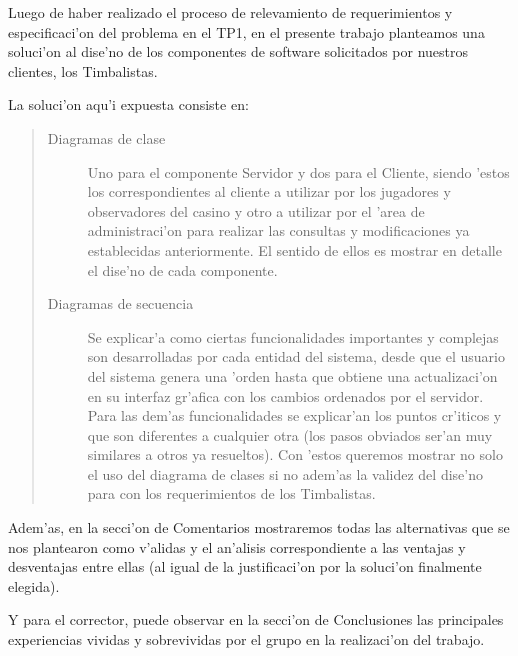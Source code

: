 Luego de haber realizado el proceso de relevamiento de requerimientos y especificaci'on del problema en el TP1, en el presente trabajo planteamos una soluci'on al dise'no de los componentes de software solicitados por nuestros clientes, los Timbalistas. 

\noindent La soluci'on aqu'i expuesta consiste en:
\begin{quote}
\begin{description}
\item[Diagramas de clase] Uno para el componente Servidor y dos para el Cliente, siendo 'estos los correspondientes al cliente a utilizar por los jugadores y observadores del casino y otro a utilizar por el 'area de administraci'on para realizar las consultas y modificaciones ya establecidas anteriormente. El sentido de ellos es mostrar en detalle el dise'no de cada componente.
\item[Diagramas de secuencia] Se explicar'a como ciertas funcionalidades importantes y complejas son desarrolladas por cada entidad del sistema, desde que el usuario del sistema genera una 'orden hasta que obtiene una actualizaci'on en su interfaz gr'afica con los cambios ordenados por el servidor. Para las dem'as funcionalidades se explicar'an los puntos cr'iticos y que son diferentes a cualquier otra (los pasos obviados ser'an muy similares a otros ya resueltos). Con 'estos queremos mostrar no solo el uso del diagrama de clases si no adem'as la validez del dise'no para con los requerimientos de los Timbalistas.
\end{description}
\end{quote} 
Adem'as, en la secci'on de Comentarios mostraremos todas las alternativas que se nos plantearon como v'alidas y el an'alisis correspondiente a las ventajas y desventajas entre ellas (al igual de la justificaci'on por la soluci'on finalmente elegida).

Y para el corrector, puede observar en la secci'on de Conclusiones las principales experiencias vividas y sobrevividas por el grupo en la realizaci'on del trabajo.
